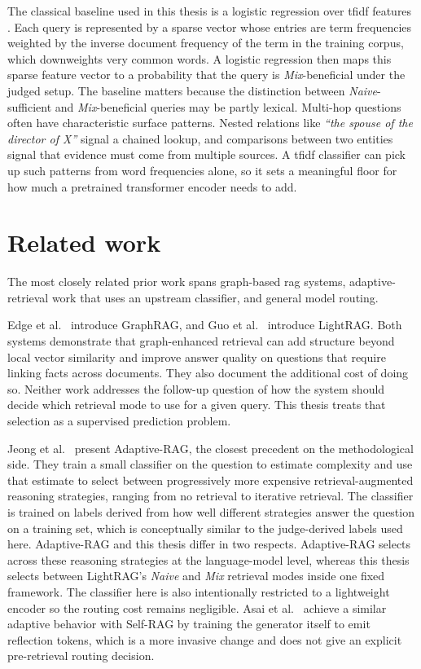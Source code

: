 \documentclass[english, bibtex]{kththesis}               %
\numberwithin{listing}{chapter}
\begin{document}
The classical baseline used in this thesis is a logistic regression over \gls{tfidf} features \cite{salton1988termweighting}. Each query is represented by a sparse vector whose entries are term frequencies weighted by the inverse document frequency of the term in the training corpus, which downweights very common words. A logistic regression then maps this sparse feature vector to a probability that the query is \emph{Mix}-beneficial under the judged setup. The baseline matters because the distinction between \emph{Naive}-sufficient and \emph{Mix}-beneficial queries may be partly lexical. Multi-hop questions often have characteristic surface patterns. Nested relations like \emph{``the spouse of the director of X''} signal a chained lookup, and comparisons between two entities signal that evidence must come from multiple sources. A \gls{tfidf} classifier can pick up such patterns from word frequencies alone, so it sets a meaningful floor for how much a pretrained transformer encoder needs to add.

\section{Related work}
\label{sec:relatedWork}

The most closely related prior work spans graph-based \gls{rag} systems, adaptive-retrieval work that uses an upstream classifier, and general model routing.

Edge et al.\ \cite{edge2024graphrag} introduce GraphRAG, and Guo et al.\ \cite{lightrag2024} introduce LightRAG. Both systems demonstrate that graph-enhanced retrieval can add structure beyond local vector similarity and improve answer quality on questions that require linking facts across documents. They also document the additional cost of doing so. Neither work addresses the follow-up question of how the system should decide which retrieval mode to use for a given query. This thesis treats that selection as a supervised prediction problem.

Jeong et al.\ \cite{jeong2024adaptiverag} present Adaptive-RAG, the closest precedent on the methodological side. They train a small classifier on the question to estimate complexity and use that estimate to select between progressively more expensive retrieval-augmented reasoning strategies, ranging from no retrieval to iterative retrieval. The classifier is trained on labels derived from how well different strategies answer the question on a training set, which is conceptually similar to the judge-derived labels used here. Adaptive-RAG and this thesis differ in two respects. Adaptive-RAG selects across these reasoning strategies at the language-model level, whereas this thesis selects between LightRAG's \emph{Naive} and \emph{Mix} retrieval modes inside one fixed framework. The classifier here is also intentionally restricted to a lightweight encoder so the routing cost remains negligible. Asai et al.\ \cite{asai2023selfrag} achieve a similar adaptive behavior with Self-RAG by training the generator itself to emit reflection tokens, which is a more invasive change and does not give an explicit pre-retrieval routing decision.
\end{document}
